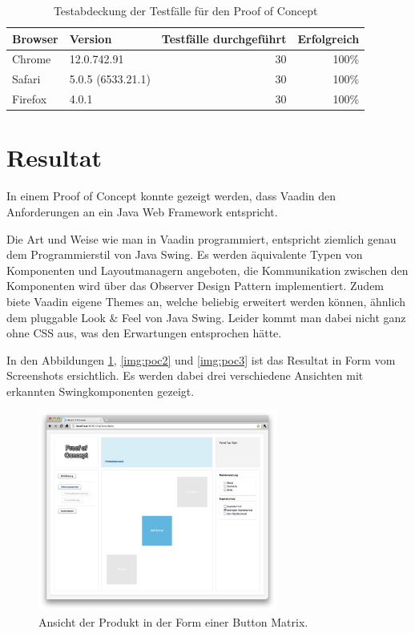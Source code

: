 \begin{table}[h!]
  \sffamily 
  \begin{center}
    \begin{tabular}{llrr}
      \toprule
      \textbf{Browser} & \textbf{Version} & \textbf{Testfälle durchgeführt} &
      \textbf{Erfolgreich}\\
      \midrule
      Chrome & 12.0.742.91 & 30 & 100\% \\
      Safari & 5.0.5 (6533.21.1) & 30 & 100\% \\
      Firefox & 4.0.1 & 30 & 100\% \\
      \bottomrule
    \end{tabular}
    \caption{Testabdeckung der Testfälle für den Proof of Concept}
    \label{tab:testabdeckung}
  \end{center}
\end{table}

\section{Resultat}

In einem Proof of Concept konnte gezeigt werden, dass Vaadin den Anforderungen
an ein Java Web Framework entspricht.

Die Art und Weise wie man in Vaadin programmiert, entspricht ziemlich genau
dem Programmierstil von Java Swing. Es werden äquivalente Typen von Komponenten
und Layoutmanagern angeboten, die Kommunikation zwischen den Komponenten
wird über das Observer Design Pattern implementiert. Zudem biete Vaadin eigene
Themes an, welche beliebig erweitert werden können, ähnlich dem pluggable Look
\& Feel von Java Swing. Leider kommt man dabei nicht ganz ohne \ac{CSS} aus, was
den Erwartungen entsprochen hätte.

In den Abbildungen \ref{img:poc1}, \ref{img:poc2} und \ref{img:poc3} ist das
Resultat in Form vom Screenshots ersichtlich. Es werden dabei drei
verschiedene Ansichten mit erkannten Swingkomponenten gezeigt.
\newline

\begin{figure}[htb]
  \begin{center}
    \includegraphics[width=0.7\textwidth]{./image/POC/poc1.png}
    \caption{Ansicht der Produkt in der Form einer Button Matrix.}
    \label{img:poc1}
  \end{center}
\end{figure}

